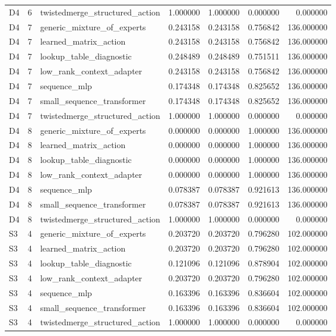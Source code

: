 \begin{tabular}{lrlrrrr}
D4 & 6 & twistedmerge_structured_action & 1.000000 & 1.000000 & 0.000000 & 0.000000 \\
D4 & 7 & generic_mixture_of_experts & 0.243158 & 0.243158 & 0.756842 & 136.000000 \\
D4 & 7 & learned_matrix_action & 0.243158 & 0.243158 & 0.756842 & 136.000000 \\
D4 & 7 & lookup_table_diagnostic & 0.248489 & 0.248489 & 0.751511 & 136.000000 \\
D4 & 7 & low_rank_context_adapter & 0.243158 & 0.243158 & 0.756842 & 136.000000 \\
D4 & 7 & sequence_mlp & 0.174348 & 0.174348 & 0.825652 & 136.000000 \\
D4 & 7 & small_sequence_transformer & 0.174348 & 0.174348 & 0.825652 & 136.000000 \\
D4 & 7 & twistedmerge_structured_action & 1.000000 & 1.000000 & 0.000000 & 0.000000 \\
D4 & 8 & generic_mixture_of_experts & 0.000000 & 0.000000 & 1.000000 & 136.000000 \\
D4 & 8 & learned_matrix_action & 0.000000 & 0.000000 & 1.000000 & 136.000000 \\
D4 & 8 & lookup_table_diagnostic & 0.000000 & 0.000000 & 1.000000 & 136.000000 \\
D4 & 8 & low_rank_context_adapter & 0.000000 & 0.000000 & 1.000000 & 136.000000 \\
D4 & 8 & sequence_mlp & 0.078387 & 0.078387 & 0.921613 & 136.000000 \\
D4 & 8 & small_sequence_transformer & 0.078387 & 0.078387 & 0.921613 & 136.000000 \\
D4 & 8 & twistedmerge_structured_action & 1.000000 & 1.000000 & 0.000000 & 0.000000 \\
S3 & 4 & generic_mixture_of_experts & 0.203720 & 0.203720 & 0.796280 & 102.000000 \\
S3 & 4 & learned_matrix_action & 0.203720 & 0.203720 & 0.796280 & 102.000000 \\
S3 & 4 & lookup_table_diagnostic & 0.121096 & 0.121096 & 0.878904 & 102.000000 \\
S3 & 4 & low_rank_context_adapter & 0.203720 & 0.203720 & 0.796280 & 102.000000 \\
S3 & 4 & sequence_mlp & 0.163396 & 0.163396 & 0.836604 & 102.000000 \\
S3 & 4 & small_sequence_transformer & 0.163396 & 0.163396 & 0.836604 & 102.000000 \\
S3 & 4 & twistedmerge_structured_action & 1.000000 & 1.000000 & 0.000000 & 0.000000 \\

\end{tabular}
